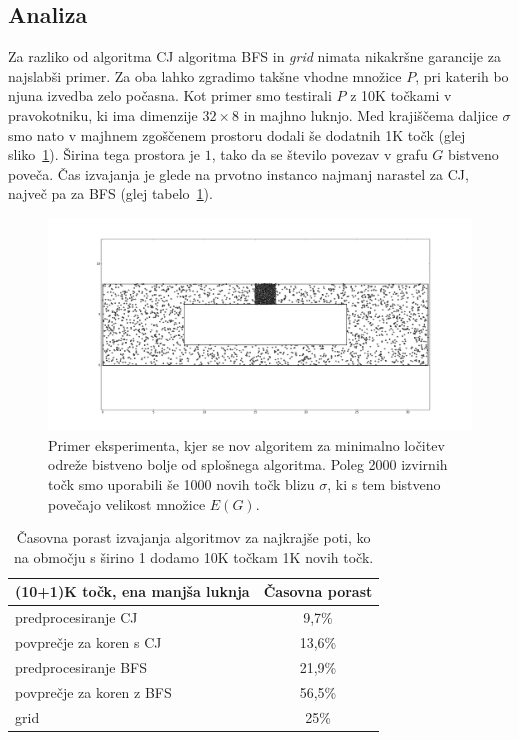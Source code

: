 \documentclass[a4paper, 12pt]{book}
\begin{document}
\subsection{Analiza}
\label{analiza}
Za razliko od algoritma CJ algoritma BFS in \textit{grid} nimata nikakršne garancije za najslabši primer. Za oba lahko zgradimo takšne vhodne množice $P$, pri katerih bo njuna izvedba zelo počasna. Kot primer smo testirali $P$ z 10K točkami v pravokotniku, ki ima dimenzije $32\times 8$ in majhno luknjo. Med krajiščema daljice $\sigma$ smo nato v majhnem zgoščenem prostoru dodali še dodatnih 1K točk (glej sliko~\ref{sep-stuffed}). Širina tega prostora je $1$, tako da se število povezav v grafu $G$ bistveno poveča. Čas izvajanja je glede na prvotno instanco najmanj narastel za CJ, največ pa za BFS (glej tabelo~\ref{table-increase}).

\begin{figure}[htp]
\centerline{\includegraphics[scale=0.3]{pics/32-1-5000-stuffed.png}}
\caption{Primer eksperimenta, kjer se nov algoritem za minimalno ločitev odreže bistveno bolje od splošnega algoritma. Poleg 2000 izvirnih točk smo uporabili še 1000 novih točk blizu $\sigma$, ki s tem bistveno povečajo velikost množice $E(G)$.}
\label{sep-stuffed}
\end{figure}

\begin{table}[htp]
\begin{center}
\begin{tabular}{l*{1}{c}}
(10+1)K točk, ena manjša luknja & \multicolumn{1}{c}{Časovna porast} \\
\hline
predprocesiranje CJ &	9,7\%		\\
povprečje za koren s CJ &	13,6\%	\\
predprocesiranje BFS & 21,9\%	\\
povprečje za koren z BFS &	56,5\% \\
grid &	25\%
\end{tabular}
\caption{Časovna porast izvajanja algoritmov za najkrajše poti, ko na območju s širino 1 dodamo 10K točkam 1K novih točk.}
\label{table-increase}
\end{center}
\end{table}
\end{document}
